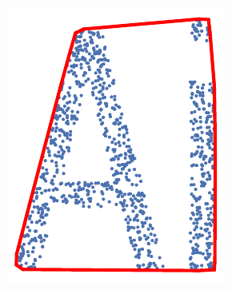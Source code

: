 \begin{figure}[t]
    \centering
  \begin{subfigure}{.25\linewidth}
    \centering
    \includegraphics[clip, trim=0.0cm 0.1cm 0.0cm 0.25cm, width=0.99\linewidth]{chapter_2_polylidar/imgs/concave_vs_convex_0.pdf}
    \caption{}
    \label{fig:ch2_convex}
  \end{subfigure}
  \begin{subfigure}{.25\linewidth}
    \centering

\end{subfigure}
\end{figure}
